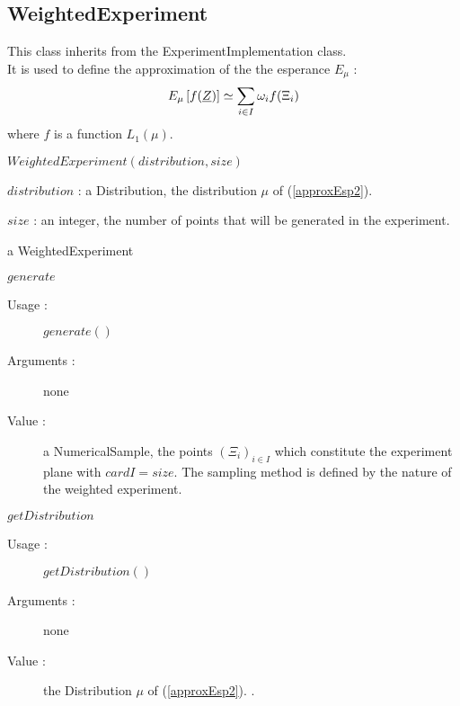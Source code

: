 \newpage \subsection{WeightedExperiment}

This class inherits from the ExperimentImplementation class.\\

It is used to define the approximation of the the esperance $E_{\mu}$ :
\begin{equation}\label{approxEsp2}
E_{\mu} \left[ f({\underline{Z}}) \right] \simeq \sum_{i \in I} \omega_i f(\Xi_i)
\end{equation} 
where $f$ is a function $L_1(\mu)$.


\begin{description}

\item[Usage :] $WeightedExperiment(distribution, size)$

\item[Arguments :]  \rule{0pt}{1em}
  \begin{description}
  \item $distribution$ : a Distribution, the distribution $\mu$ of (\ref{approxEsp2}).
  \item $size$ : an integer, the number of points that will be generated in the experiment.
  \end{description}


\item[Value :] a WeightedExperiment

\item[Some methods :]  \rule{0pt}{1em}

  \begin{description}

  \item $generate$
    \begin{description}
    \item[Usage :] $generate()$
    \item[Arguments :] none
    \item[Value :] a NumericalSample, the points $(\Xi_i)_{i \in I}$ which constitute the experiment plane with $card I = size$. The sampling method is defined by the nature of the weighted experiment.
    \end{description}
    \bigskip

  \item $getDistribution$
    \begin{description}
    \item[Usage :] $getDistribution()$
    \item[Arguments :] none
    \item[Value :] the Distribution $\mu$ of (\ref{approxEsp2}).
.
    \end{description}
    \bigskip


\end{description}
\end{description}
